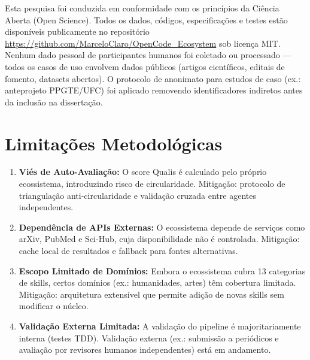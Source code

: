 Esta pesquisa foi conduzida em conformidade com os princípios da Ciência Aberta (Open Science). Todos os dados, códigos, especificações e testes estão disponíveis publicamente no repositório \url{https://github.com/MarceloClaro/OpenCode_Ecosystem} sob licença MIT. Nenhum dado pessoal de participantes humanos foi coletado ou processado --- todos os casos de uso envolvem dados públicos (artigos científicos, editais de fomento, datasets abertos). O protocolo de anonimato para estudos de caso (ex.: anteprojeto PPGTE/UFC) foi aplicado removendo identificadores indiretos antes da inclusão na dissertação.

\section{Limitações Metodológicas}

\begin{enumerate}
  \item \textbf{Viés de Auto-Avaliação:} O score Qualis é calculado pelo próprio ecossistema, introduzindo risco de circularidade. Mitigação: protocolo de triangulação anti-circularidade e validação cruzada entre agentes independentes.
  \item \textbf{Dependência de APIs Externas:} O ecossistema depende de serviços como arXiv, PubMed e Sci-Hub, cuja disponibilidade não é controlada. Mitigação: cache local de resultados e fallback para fontes alternativas.
  \item \textbf{Escopo Limitado de Domínios:} Embora o ecossistema cubra 13 categorias de skills, certos domínios (ex.: humanidades, artes) têm cobertura limitada. Mitigação: arquitetura extensível que permite adição de novas skills sem modificar o núcleo.
  \item \textbf{Validação Externa Limitada:} A validação do pipeline é majoritariamente interna (testes TDD). Validação externa (ex.: submissão a periódicos e avaliação por revisores humanos independentes) está em andamento.
\end{enumerate}

\newpage
